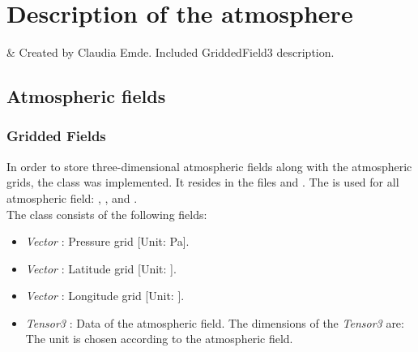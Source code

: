 \chapter{Description of the atmosphere}
 \label{sec:atmosphere}

 & Created by Claudia Emde. Included GriddedField3 description.\\ 
\stophistory


\section{Atmospheric fields} 

\subsection{Gridded Fields} 

In order to store three-dimensional atmospheric fields along with the
atmospheric grids, the class  was
implemented. It resides in the files  and
.  The  is used
for all atmospheric field: , ,
 and .\\

The class  consists of the following fields:
\begin{itemize}
\item {\sl Vector} : Pressure grid [Unit: Pa].
\item {\sl Vector} : Latitude grid [Unit:
  \degree].
\item {\sl Vector} : Longitude grid [Unit:
  \degree].
\item {\sl Tensor3} : Data of the atmospheric
  field. The dimensions of the {\sl Tensor3} are:
  \\
  The unit is chosen according to the atmospheric field. 
\end{itemize} 




